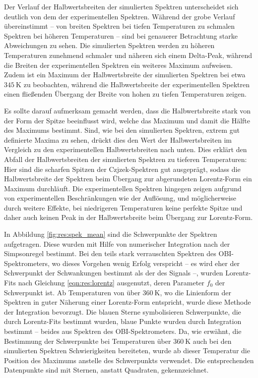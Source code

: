 Der Verlauf der Halbwertsbreiten der simulierten Spektren unterscheidet sich deutlich von dem der experimentellen Spektren. Während der grobe Verlauf übereinstimmt -- von breiten Spektren bei tiefen Temperaturen zu schmalen Spektren bei höheren Temperaturen -- sind bei genauerer Betrachtung starke Abweichungen zu sehen. Die simulierten Spektren werden zu höheren Temperaturen zunehmend schmaler und näheren sich einem Delta-Peak, während die Breiten der experimentellen Spektren ein weiteres Maximum aufweisen. Zudem ist ein Maximum der Halbwertsbreite der simulierten Spektren bei etwa $\SI{345}{\kelvin}$ zu beobachten, während die Halbwertsbreite der experimentellen Spektren einen fließenden Übergang der Breite von hohen zu tiefen Temperaturen zeigen.

Es sollte darauf aufmerksam gemacht werden, dass die Halbwertsbreite stark von der Form der Spitze beeinflusst wird, welche das Maximum und damit die Hälfte des Maximums bestimmt. Sind, wie bei den simulierten Spektren, extrem gut definierte Maxima zu sehen, drückt dies den Wert der Halbwertsbreiten im Vergleich zu den experimentellen Halbwertsbreiten nach unten. Dies erklärt den Abfall der Halbwertsbreiten der simulierten Spektren zu tieferen Temperaturen: Hier sind die scharfen Spitzen der Czjzek-Spektren gut ausgeprägt, sodass die Halbwertsbreite der Spektren beim Übergang zur abgerundeten Lorentz-Form ein Maximum durchläuft. Die experimentellen Spektren hingegen zeigen aufgrund von experimentellen Beschränkungen wie der Auflösung, und möglicherweise durch weitere Effekte, bei niedrigeren Temperaturen keine perfekte Spitze und daher auch keinen Peak in der Halbwertsbreite beim Übergang zur Lorentz-Form.

\par\bigskip

In Abbildung \ref{fig:res:spek_mean} sind die Schwerpunkte der Spektren aufgetragen. Diese wurden mit Hilfe von numerischer Integration nach der Simpsonregel bestimmt. Bei den teils stark verrauschten Spektren des OBI-Spektrometers, wo dieses Vorgehen wenig Erfolg verspricht -- es wird eher der Schwerpunkt der Schwankungen bestimmt als der des Signals --, wurden Lorentz-Fits nach Gleichung \eqref{eqn:res:lorentz} ausgenutzt, deren Parameter $f_0$ der Schwerpunkt ist. Ab Temperaturen von über $\SI{360}{\kelvin}$, wo die Linienform der Spektren in guter Näherung einer Lorentz-Form entspricht, wurde diese Methode der Integration bevorzugt. Die blauen Sterne symbolisieren Schwerpunkte, die durch Lorentz-Fits bestimmt wurden, blaue Punkte wurden durch Integration bestimmt -- beides aus Spektren des OBI-Spektrometers. Da, wie erwähnt, die Bestimmung der Schwerpunkte bei Temperaturen über $\SI{360}{\kelvin}$ auch bei den simulierten Spektren Schwierigkeiten bereiteten, wurde ab dieser Temperatur die Position des Maximums anstelle des Schwerpunkts verwendet. Die entsprechenden Datenpunkte sind mit Sternen, anstatt Quadraten, gekennzeichnet.

